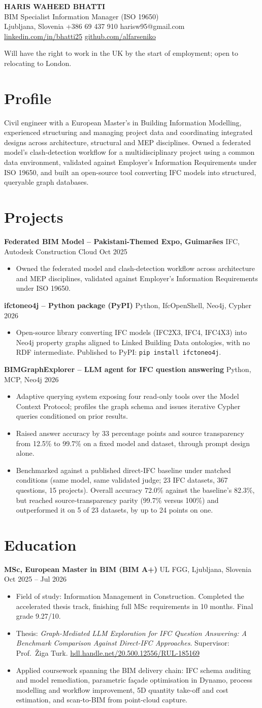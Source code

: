 \documentclass[a4paper,10.5pt]{article}
\newcommand{\datefill}{\dotfill}
\newcommand{\entry}[3]{\vspace{2.5pt}\noindent\textbf{#1} \textbar{} #2 \datefill{} #3\par\vspace{0.5pt}}
\newcommand{\ROLELINE}{BIM Specialist \textbar{} Information Manager (ISO 19650)}
\newcommand{\projIfcToNeo}{%
\entry{ifctoneo4j -- Python package (PyPI)}{Python, IfcOpenShell, Neo4j, Cypher}{2026}
\begin{itemize}
  \item Open-source library converting IFC models (IFC2X3, IFC4, IFC4X3) into Neo4j
        property graphs aligned to Linked Building Data ontologies, with no RDF
        intermediate. Published to PyPI: \texttt{pip install ifctoneo4j}.
\end{itemize}}
\newcommand{\projBIMGraph}{%
\entry{BIMGraphExplorer -- LLM agent for IFC question answering}{Python, MCP, Neo4j}{2026}
\begin{itemize}
  \item Adaptive querying system exposing four read-only tools over the Model
        Context Protocol; profiles the graph schema and issues iterative Cypher
        queries conditioned on prior results.
  \item Raised answer accuracy by 33 percentage points and source transparency from
        12.5\% to 99.7\% on a fixed model and dataset, through prompt design alone.
  \item Benchmarked against a published direct-IFC baseline under matched
        conditions (same model, same validated judge; 23 IFC datasets, 367
        questions, 15 projects). Overall accuracy 72.0\% against the baseline's
        82.3\%, but reached source-transparency parity (99.7\% versus 100\%) and
        outperformed it on 5 of 23 datasets, by up to 24 points on one.
\end{itemize}}
\newcommand{\projGuimaraes}{%
\entry{Federated BIM Model -- Pakistani-Themed Expo, Guimar\~aes}{IFC, Autodesk Construction Cloud}{Oct 2025}
\begin{itemize}
  \item Owned the federated model and clash-detection workflow across architecture
        and MEP disciplines, validated against Employer's Information Requirements
        under ISO 19650.
\end{itemize}}
\begin{document}
\begin{center}
  {\LARGE\bfseries HARIS WAHEED BHATTI}\\[2pt]
  {\large \ROLELINE}\\[3pt]
  Ljubljana, Slovenia \textbar{} +386 69 437 910 \textbar{} harisw95@gmail.com\\
  \href{https://linkedin.com/in/bhatti25}{linkedin.com/in/bhatti25} \textbar{}
  \href{https://github.com/alfarseniko}{github.com/alfarseniko}
\end{center}
\vspace{-4pt}
\noindent\small Will have the right to work in the UK by the start of employment; open
to relocating to London.\normalsize

\section{Profile}

\noindent Civil engineer with a European Master's in Building Information Modelling,
experienced structuring and managing project data and coordinating integrated
designs across architecture, structural and MEP disciplines. Owned a federated
model's clash-detection workflow for a multidisciplinary project using a common data
environment, validated against Employer's Information Requirements under ISO 19650,
and built an open-source tool converting IFC models into structured, queryable
graph databases.

\section{Projects}

 \projGuimaraes \projIfcToNeo \projBIMGraph

\section{Education}
\entry{MSc, European Master in BIM (BIM A+)}{UL FGG, Ljubljana, Slovenia}{Oct 2025 -- Jul 2026}
\begin{itemize}
  \item Field of study: Information Management in Construction. Completed the
        accelerated thesis track, finishing full MSc requirements in 10 months.
        Final grade 9.27/10.
  \item Thesis: \textit{Graph-Mediated LLM Exploration for IFC Question Answering:
        A Benchmark Comparison Against Direct-IFC Approaches}. Supervisor:
        Prof.~\v{Z}iga Turk. \href{http://hdl.handle.net/20.500.12556/RUL-185169}{hdl.handle.net/20.500.12556/RUL-185169}
  \item Applied coursework spanning the BIM delivery chain: IFC schema auditing and model remediation, parametric façade optimisation in Dynamo, process modelling and workflow improvement, 5D quantity take-off and cost estimation, and scan-to-BIM from point-cloud capture.
\end{itemize}
\end{document}
